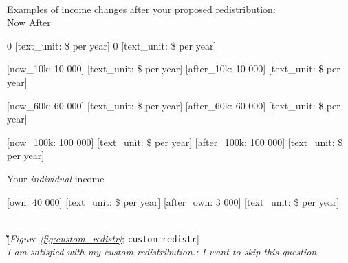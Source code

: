 \begin{enumerate}[resume]
\\Examples of income changes after your proposed redistribution:\\

    
		Now
        After
    
    
        0 [text\_unit: \$ per year]
        0 [text\_unit: \$ per year]
    
    
        [now\_10k: 10 000] [text\_unit: \$ per year]
        [after\_10k: 10 000] [text\_unit: \$ per year]
    
    
        [now\_60k: 60 000] [text\_unit: \$ per year]
        [after\_60k: 60 000] [text\_unit: \$ per year]
    
    
        [now\_100k: 100 000] [text\_unit: \$ per year]
        [after\_100k: 100 000] [text\_unit: \$ per year]
    
    
		Your \textit{individual} income
    
    
        [own: 40 000] [text\_unit: \$ per year]
        [after\_own: 3 000] [text\_unit: \$ per year]
    


\~

\~
\\

\~

\~

\~ [\textit{Figure \ref{fig:custom_redistr}}; 
\verb|custom_redistr|]
  \\ \textit{I am satisfied with my custom redistribution.; I want to skip this question.}

\end{enumerate} 

